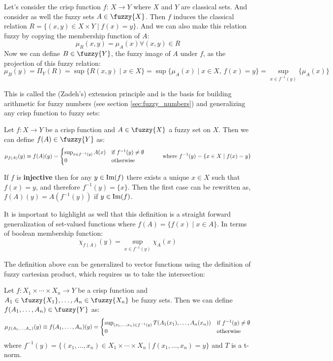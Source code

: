 Let's consider the crisp function $f:\,X \longrightarrow Y$ where $X$ and $Y$ are classical sets. And consider as well the fuzzy sets $A \in \fuzzy{X}$. Then $f$ induces the classical relation $R=\{(x,y)\in X\times Y \mid f(x)=y\}$. And we can also make this relation fuzzy by copying the membership function of $A$:
$$ \mu_R (x,y) = \mu_A (x) \forall (x,y)\in R$$
Now we can define $B\in\fuzzy{Y}$, the fuzzy image of $A$ under $f$, as the projection of this fuzzy relation:
$$\mu_B (y) = \Pi_Y (R) = \sup\{R(x,y)\mid x\in X\} = \sup\{\mu_A (x)\mid x\in X, \, f(x)= y\} = \sup_{x\in f^{-1}(y)}\{\mu_A(x)\}$$

This is called the (Zadeh's) extension principle and is the basis for building arithmetic for fuzzy numbers (see section \ref{sec:fuzzy_numbers}) and generalizing any crisp function to fuzzy sets: 

\begin{definition}
  Let $f: X \longrightarrow Y$ be a crisp function and $A\in \fuzzy{X}$ a fuzzy set on $X$. Then we can define $f(A)\in \fuzzy{Y}$ as:
  \[
  \mu_{f(A)}(y)\equiv f(A)(y) = 
  \begin{cases}
    \sup_{x\in f^{-1}(y)}A(x) & \textnormal{if } f^{-1}(y)\neq \emptyset\\
    0 & \textnormal{otherwise}
  \end{cases}
  \quad\quad\quad \textnormal{where } f^{-1}(y)=\{x\in X \mid f(x)=y\}
  \]
\end{definition}


\begin{remark}
  If $f$ is \textbf{injective} then for any $y \in \textnormal{Im}(f)$ there exists a unique $x \in X$ such that $f(x)=y$, and therefore $f^{-1}(y)=\{x\}$. Then the first case can be rewritten as, $f(A)(y) = A(f^{-1}(y))$ if $y \in \textnormal{Im}(f)$.
\end{remark}

It is important to highlight as well that this definition is a straight forward generalization of set-valued functions where $f(A)= \{f(x)\mid x\in A\}$. In terms of boolean membership function:
$$\chi _{f(A)}(y)=\sup_{x\in f^{-1}(y)}\chi_A(x)$$

The definition above can be generalized to vector functions using the definition of fuzzy cartesian product, which requires us to take the intersection:

\begin{definition}
  Let $f: X_1 \times \cdots \times X_n \longrightarrow Y$ be a crisp function and $A_1 \in \fuzzy{X_1}, \ldots, A_n \in \fuzzy{X_n}$ be fuzzy sets. Then we can define $f(A_1,\ldots,A_n)\in \fuzzy{Y}$ as:
  \[
  \mu_{f(A_1,\ldots,A_n)}(y)\equiv f(A_1,\ldots,A_n)(y) = 
  \begin{cases}
    \sup_{(x_1,\ldots,x_n)\in f^{-1}(y)} T(A_1(x_1),\ldots,A_n(x_n)) & \textnormal{if } f^{-1}(y)\neq \emptyset\\
    0 & \textnormal{otherwise}
  \end{cases}
  \]
  where $f^{-1}(y)=\{(x_1,\ldots,x_n)\in X_1\times\cdots\times X_n \mid f(x_1,\ldots,x_n)=y\}$ and $T$ is a t-norm.
\end{definition}

